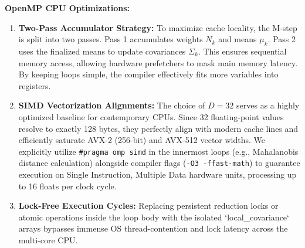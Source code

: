 \documentclass[10pt]{article}
\begin{document}
\textbf{OpenMP CPU Optimizations:}
\begin{enumerate}
    \item \textbf{Two-Pass Accumulator Strategy:} To maximize cache locality, the M-step is split into two passes. Pass 1 accumulates weights $N_k$ and means $\mu_k$. Pass 2 uses the finalized means to update covariances $\Sigma_k$. This ensures sequential memory access, allowing hardware prefetchers to mask main memory latency. By keeping loops simple, the compiler effectively fits more variables into registers.
    \item \textbf{SIMD Vectorization Alignments:} The choice of $D=32$ serves as a highly optimized baseline for contemporary CPUs. Since 32 floating-point values resolve to exactly 128 bytes, they perfectly align with modern cache lines and efficiently saturate AVX-2 (256-bit) and AVX-512 vector widths. We explicitly utilize \texttt{\#pragma omp simd} in the innermost loops (e.g., Mahalanobis distance calculation) alongside compiler flags (\texttt{-O3 -ffast-math}) to guarantee execution on Single Instruction, Multiple Data hardware units, processing up to 16 floats per clock cycle.
    \item \textbf{Lock-Free Execution Cycles:} Replacing persistent reduction locks or atomic operations inside the loop body with the isolated `local\_covariance` arrays bypasses immense OS thread-contention and lock latency across the multi-core CPU.
\end{enumerate}
\end{document}

